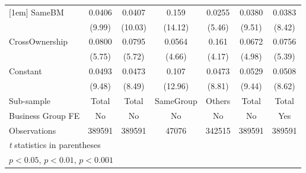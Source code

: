 {\begin{tabular}{l*{6}{c}}
[1em]
SameBM              &      0.0406\sym{***}&      0.0407\sym{***}&       0.159\sym{***}&      0.0255\sym{***}&      0.0380\sym{***}&      0.0383\sym{***}\\
                    &      (9.99)         &     (10.03)         &     (14.12)         &      (5.46)         &      (9.51)         &      (8.42)         \\
[1em]
CrossOwnership      &      0.0800\sym{***}&      0.0795\sym{***}&      0.0564\sym{***}&       0.161\sym{***}&      0.0672\sym{***}&      0.0756\sym{***}\\
                    &      (5.75)         &      (5.72)         &      (4.66)         &      (4.17)         &      (4.98)         &      (5.39)         \\
[1em]
Constant            &      0.0493\sym{***}&      0.0473\sym{***}&       0.107\sym{***}&      0.0473\sym{***}&      0.0529\sym{***}&      0.0508\sym{***}\\
                    &      (9.48)         &      (8.49)         &     (12.96)         &      (8.81)         &      (9.44)         &      (8.62)         \\
\hline
Sub-sample          &       Total         &       Total         &   SameGroup         &      Others         &       Total         &       Total         \\
Business Group FE   &          No         &          No         &          No         &          No         &          No         &         Yes         \\
Observations        &      389591         &      389591         &       47076         &      342515         &      389591         &      389591         \\
\hline\hline
\multicolumn{7}{l}{\footnotesize \textit{t} statistics in parentheses}\\
\multicolumn{7}{l}{\footnotesize \sym{*} \(p<0.05\), \sym{**} \(p<0.01\), \sym{***} \(p<0.001\)}\\
\end{tabular}
}
